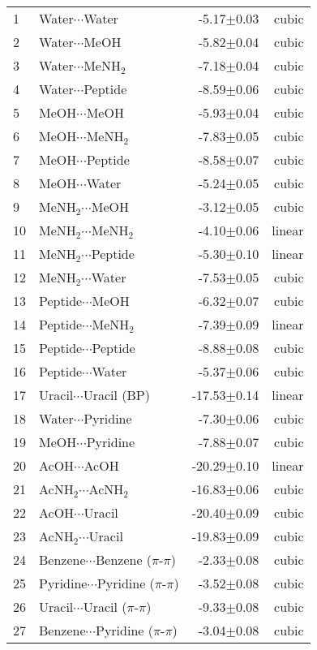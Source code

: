\begin{longtable}{llrr}
1 & Water$\cdots$Water & -5.17$\pm$0.03 & cubic \\
2 & Water$\cdots$MeOH & -5.82$\pm$0.04 & cubic \\
3 & Water$\cdots$MeNH$_2$ & -7.18$\pm$0.04 & cubic \\
4 & Water$\cdots$Peptide & -8.59$\pm$0.06 & cubic \\
5 & MeOH$\cdots$MeOH & -5.93$\pm$0.04 & cubic \\
6 & MeOH$\cdots$MeNH$_2$ & -7.83$\pm$0.05 & cubic \\
7 & MeOH$\cdots$Peptide & -8.58$\pm$0.07 & cubic \\
8 & MeOH$\cdots$Water & -5.24$\pm$0.05 & cubic \\
9 & MeNH$_2$$\cdots$MeOH & -3.12$\pm$0.05 & cubic \\
10 & MeNH$_2$$\cdots$MeNH$_2$ & -4.10$\pm$0.06 & linear \\
11 & MeNH$_2$$\cdots$Peptide & -5.30$\pm$0.10 & linear \\
12 & MeNH$_2$$\cdots$Water & -7.53$\pm$0.05 & cubic \\
13 & Peptide$\cdots$MeOH & -6.32$\pm$0.07 & cubic \\
14 & Peptide$\cdots$MeNH$_2$ & -7.39$\pm$0.09 & linear \\
15 & Peptide$\cdots$Peptide & -8.88$\pm$0.08 & cubic \\
16 & Peptide$\cdots$Water & -5.37$\pm$0.06 & cubic \\
17 & Uracil$\cdots$Uracil (BP) & -17.53$\pm$0.14 & linear \\
18 & Water$\cdots$Pyridine & -7.30$\pm$0.06 & cubic \\
19 & MeOH$\cdots$Pyridine & -7.88$\pm$0.07 & cubic \\
20 & AcOH$\cdots$AcOH & -20.29$\pm$0.10 & linear \\
21 & AcNH$_2$$\cdots$AcNH$_2$ & -16.83$\pm$0.06 & cubic \\
22 & AcOH$\cdots$Uracil & -20.40$\pm$0.09 & cubic \\
23 & AcNH$_2$$\cdots$Uracil & -19.83$\pm$0.09 & cubic \\
24 & Benzene$\cdots$Benzene ($\pi$-$\pi$) & -2.33$\pm$0.08 & cubic \\
25 & Pyridine$\cdots$Pyridine ($\pi$-$\pi$) & -3.52$\pm$0.08 & cubic \\
26 & Uracil$\cdots$Uracil ($\pi$-$\pi$) & -9.33$\pm$0.08 & cubic \\
27 & Benzene$\cdots$Pyridine ($\pi$-$\pi$) & -3.04$\pm$0.08 & cubic \\

\end{longtable}
